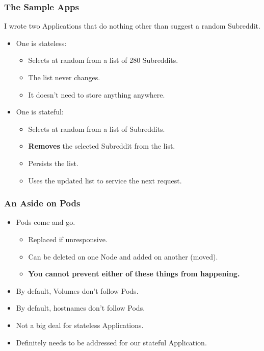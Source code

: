 \documentclass{beamer}
\begin{document}
\begin{frame}
    \frametitle{The Sample Apps}
    I wrote two Applications that do nothing other than suggest a random Subreddit.\pause
    \begin{itemize}
        \item One is stateless:
        \begin{itemize}
            \item Selects at random from a list of 280 Subreddits.\pause
            \item The list never changes.\pause
            \item It doesn't need to store anything anywhere.\pause
        \end{itemize}
        \item One is stateful:
        \begin{itemize}
            \item Selects at random from a list of Subreddits.\pause
            \item \textbf{Removes} the selected Subreddit from the list.\pause
            \item Persists the list.\pause
            \item Uses the updated list to service the next request.
        \end{itemize}
    \end{itemize}
\end{frame}

\begin{frame}
    \frametitle{An Aside on Pods}
    \begin{itemize}
        \item Pods come and go.\pause
        \begin{itemize}
            \item Replaced if unresponsive.\pause
            \item Can be deleted on one Node and added on another (moved).\pause
            \item \textbf{You cannot prevent either of these things from happening.}\pause
        \end{itemize}
        \item By default, Volumes don't follow Pods.\pause
        \item By default, hostnames don't follow Pods.\pause
        \item Not a big deal for stateless Applications.\pause
        \item Definitely needs to be addressed for our stateful Application.
    \end{itemize}
\end{frame}
\end{document}
